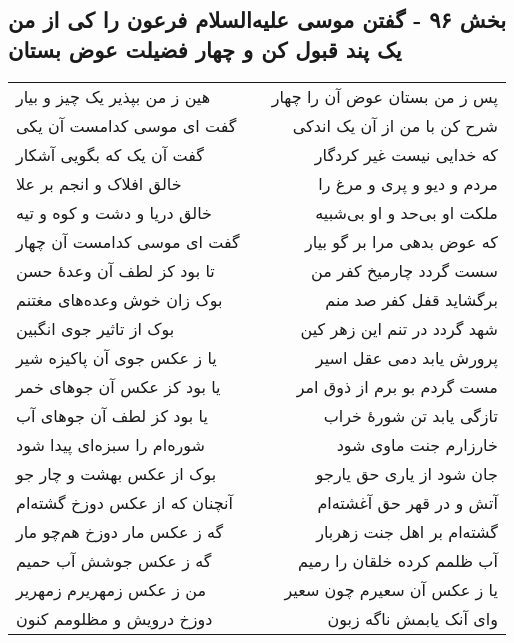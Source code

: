 \begin{center}
\section*{بخش ۹۶ - گفتن موسی علیه‌السلام فرعون را کی از من یک پند قبول کن و چهار فضیلت عوض بستان}
\label{sec:sh096}
\begin{longtable}{l p{0.5cm} r}
هین ز من بپذیر یک چیز و بیار
&&
پس ز من بستان عوض آن را چهار
\\
گفت ای موسی کدامست آن یکی
&&
شرح کن با من از آن یک اندکی
\\
گفت آن یک که بگویی آشکار
&&
که خدایی نیست غیر کردگار
\\
خالق افلاک و انجم بر علا
&&
مردم و دیو و پری و مرغ را
\\
خالق دریا و دشت و کوه و تیه
&&
ملکت او بی‌حد و او بی‌شبیه
\\
گفت ای موسی کدامست آن چهار
&&
که عوض بدهی مرا بر گو بیار
\\
تا بود کز لطف آن وعدهٔ حسن
&&
سست گردد چارمیخ کفر من
\\
بوک زان خوش وعده‌های مغتنم
&&
برگشاید قفل کفر صد منم
\\
بوک از تاثیر جوی انگبین
&&
شهد گردد در تنم این زهر کین
\\
یا ز عکس جوی آن پاکیزه شیر
&&
پرورش یابد دمی عقل اسیر
\\
یا بود کز عکس آن جوهای خمر
&&
مست گردم بو برم از ذوق امر
\\
یا بود کز لطف آن جوهای آب
&&
تازگی یابد تن شورهٔ خراب
\\
شوره‌ام را سبزه‌ای پیدا شود
&&
خارزارم جنت ماوی شود
\\
بوک از عکس بهشت و چار جو
&&
جان شود از یاری حق یارجو
\\
آنچنان که از عکس دوزخ گشته‌ام
&&
آتش و در قهر حق آغشته‌ام
\\
گه ز عکس مار دوزخ هم‌چو مار
&&
گشته‌ام بر اهل جنت زهربار
\\
گه ز عکس جوشش آب حمیم
&&
آب ظلمم کرده خلقان را رمیم
\\
من ز عکس زمهریرم زمهریر
&&
یا ز عکس آن سعیرم چون سعیر
\\
دوزخ درویش و مظلومم کنون
&&
وای آنک یابمش ناگه زبون
\\
\end{longtable}
\end{center}
